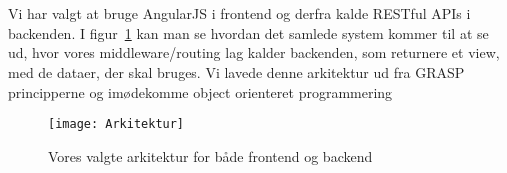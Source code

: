 \section{}
Vi har valgt at bruge AngularJS i frontend og derfra kalde RESTful APIs i backenden. I figur~\ref{fig:arkitektur} 
kan man se hvordan det samlede system kommer til at se ud, hvor vores middleware/routing lag kalder backenden,
som returnere et view, med de dataer, der skal bruges.
Vi lavede denne arkitektur ud fra GRASP principperne og imødekomme object orienteret programmering
\begin{figure}[here]
\texttt{[image: Arkitektur]}
\caption{Vores valgte arkitektur for både frontend og backend}
\label{fig:arkitektur}
\end{figure}
